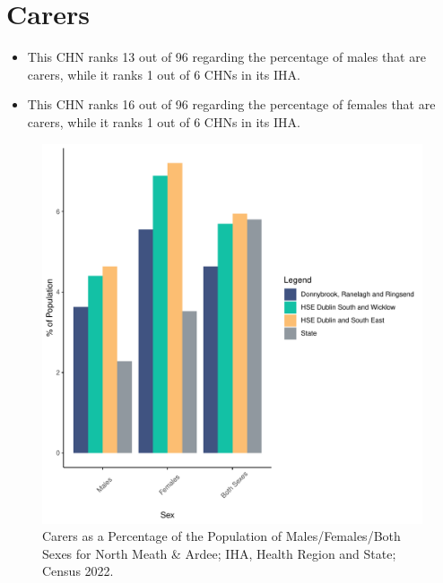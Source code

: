 \documentclass{article}
\begin{document}
\section{Carers}\label{sect:Carers}
\begin{itemize}
\item This CHN ranks  13 out of 96 regarding the percentage of males that are carers, while it ranks   1 out of 6 CHNs in its IHA.
\item This CHN ranks  16 out of 96 regarding the percentage of females that are carers, while it ranks   1 out of 6 CHNs in its IHA.
\end{itemize}
\begin{figure}[H]
	\centering
	\includegraphics[width = 150mm]{../figures/CareED.pdf}
	\caption{Carers as a Percentage of the Population of Males/Females/Both Sexes for North Meath & Ardee; IHA, Health Region and State; Census 2022.}
	\label{fig:2ae19629-1a6a-13a3-e055-000000000001}
	\end{figure}
\end{document}
